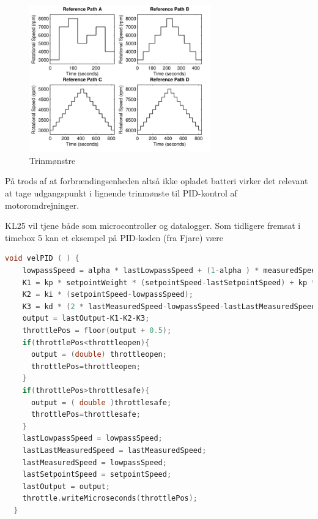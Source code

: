 \begin{figure}[h]
  \centering
  \includegraphics[width=0.7\textwidth]{refpaths.JPG}
  \caption{Trinmønstre}
  \label{fig:paths}
\end{figure}

På trods af at forbrændingsenheden altså ikke opladet batteri virker det relevant at tage udgangspunkt i lignende trinmønste til PID-kontrol af motoromdrejninger.

KL25 vil tjene både som microcontroller og datalogger. Som tidligere fremsat i timebox 5 kan et eksempel på PID-koden (fra Fjare\autocite{pid1}) være
\clearpage
\begin{lstlisting}[language=C,basicstyle=\ttfamily]
  void velPID ( ) {
    lowpassSpeed = alpha * lastLowpassSpeed + (1-alpha ) * measuredSpeed;
    K1 = kp * setpointWeight * (setpointSpeed-lastSetpointSpeed) + kp * (lastMeasuredSpeed-lowpassSpeed);
    K2 = ki * (setpointSpeed-lowpassSpeed);
    K3 = kd * (2 * lastMeasuredSpeed-lowpassSpeed-lastLastMeasuredSpeed);
    output = lastOutput-K1-K2-K3;
    throttlePos = floor(output + 0.5);
    if(throttlePos<throttleopen){
      output = (double) throttleopen;
      throttlePos=throttleopen;
    }
    if(throttlePos>throttlesafe){
      output = ( double )throttlesafe;
      throttlePos=throttlesafe;
    }
    lastLowpassSpeed = lowpassSpeed;
    lastLastMeasuredSpeed = lastMeasuredSpeed;
    lastMeasuredSpeed = lowpassSpeed;
    lastSetpointSpeed = setpointSpeed;
    lastOutput = output;
    throttle.writeMicroseconds(throttlePos);
  }
\end{lstlisting}


